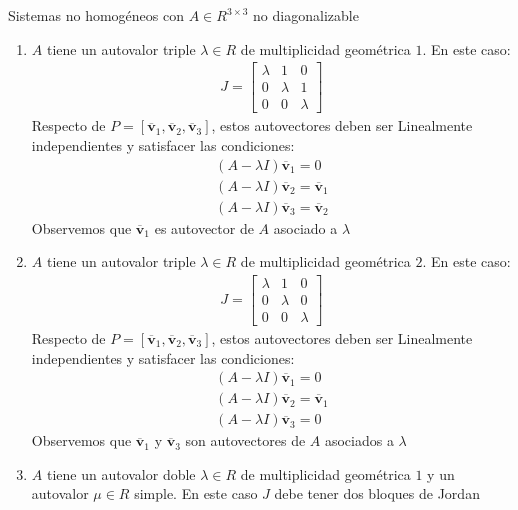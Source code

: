 \documentclass[a4paper, twoside]{article}
\numberwithin{equation}{section}
\numberwithin{figure}{section}
\numberwithin{table}{section}
\newcommand{\vect}[1]{\overline{\textbf{#1}}}
\begin{document}
\begin{corolario}{Sistemas no homogéneos con $A \in R^{3 \times 3}$ no diagonalizable}
  \begin{enumerate}
    \item $A$ tiene un autovalor triple $\lambda \in R$ de multiplicidad geométrica $1$. En este caso:
    \begin{align}
      J=\begin{bmatrix} {\lambda}&{1}&{0} \\ {0}&{\lambda}&{1} \\ {0}&{0}&{\lambda} \end{bmatrix}
    \end{align}
    Respecto de $P=[\vect{v}_1,\vect{v}_2,\vect{v}_3]$, estos autovectores deben ser Linealmente independientes y satisfacer las condiciones:
    \begin{align}
      \left( A-\lambda I \right)\vect{v}_1=0 \\
      \left( A-\lambda I \right)\vect{v}_2=\vect{v}_1 \\
      \left( A-\lambda I \right)\vect{v}_3=\vect{v}_2
    \end{align}
    Observemos que $\vect{v}_1$ es autovector de $A$ asociado a $\lambda$
    \item $A$ tiene un autovalor triple $\lambda \in R$ de multiplicidad geométrica $2$. En este caso:
    \begin{align}
    J=\begin{bmatrix} {\lambda}&{1}&{0} \\ {0}&{\lambda}&{0} \\ {0}&{0}&{\lambda} \end{bmatrix}
    \end{align}
    Respecto de $P=[\vect{v}_1,\vect{v}_2,\vect{v}_3]$, estos autovectores deben ser Linealmente independientes y satisfacer las condiciones:
    \begin{align}
      \left( A-\lambda I \right)\vect{v}_1=0 \\
      \left( A-\lambda I \right)\vect{v}_2=\vect{v}_1 \\
      \left( A-\lambda I \right)\vect{v}_3=0
    \end{align}
    Observemos que $\vect{v}_1$ y $\vect{v}_3$ son autovectores de $A$ asociados a $\lambda$
    \item $A$ tiene un autovalor doble $\lambda \in R$ de multiplicidad geométrica $1$ y un autovalor $\mu \in R$ simple. En este caso $J$ debe tener dos bloques de Jordan
    \begin{align}

\end{align}
\end{enumerate}
\end{corolario}
\end{document}
